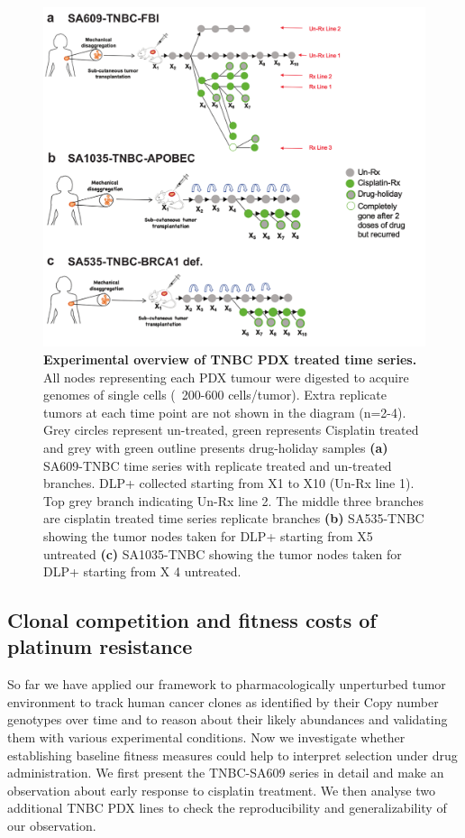 \begin{figure}
\centering
\includegraphics[width=\textwidth]{Figures/treatedtimeseriesgreen.pdf}

\caption[Experimental overview of TNBC PDX treated time series]
	{\small
	\textbf{Experimental overview of TNBC PDX treated time series.}
	      All nodes representing each PDX tumour were digested to acquire genomes of single cells (~200-600 cells/tumor). Extra replicate tumors at each time point are not shown in the diagram (n=2-4). Grey circles represent un-treated, green represents Cisplatin treated and grey with green outline presents drug-holiday samples \textbf{(a)} SA609-TNBC time series with replicate treated and un-treated branches. DLP+ collected starting from X1 to X10 (Un-Rx line 1). Top grey branch indicating Un-Rx line 2. The middle three branches are cisplatin treated time series replicate branches \textbf{(b)} SA535-TNBC showing the tumor nodes taken for DLP+ starting from X5 untreated \textbf{(c)} SA1035-TNBC showing the tumor nodes taken for DLP+ starting from X 4 untreated.}
	
	\label{fig:treatedtimeseriesgreen}
\end{figure}

\subsection{Clonal competition and fitness costs of platinum resistance}
So far we have applied our framework to pharmacologically unperturbed tumor environment to track human cancer clones as identified by their Copy number genotypes over time and to reason about their likely abundances and validating them with various experimental conditions. Now we investigate whether establishing baseline fitness measures could help to interpret selection under drug administration. We first present the TNBC-SA609 series in detail and make an observation about early response to cisplatin treatment. We then analyse two
additional TNBC PDX lines to check the reproducibility  and generalizability of our observation.

